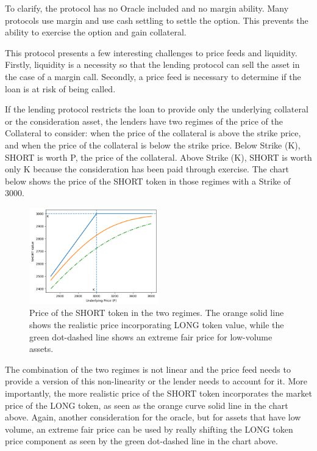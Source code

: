 \documentclass[%
 reprint,
 amsmath,amssymb,
 aps,
]{revtex4-2}
\begin{document}
To clarify, the protocol has no Oracle included and no margin ability. 
Many protocols use margin and use cash settling to settle the option.
This prevents the ability to exercise the option and gain collateral.

This protocol presents a few interesting challenges to price feeds and liquidity. 
Firstly, liquidity is a necessity so that the lending protocol can sell the asset in the case of a margin call.
Secondly, a price feed is necessary to determine if the loan is at risk of being called.

If the lending protocol restricts the loan to provide only the underlying collateral or the consideration asset,
the lenders have two regimes of the price of the Collateral to consider: 
when the price of the collateral is above the strike price, and when the price of the collateral is below the strike price.
Below Strike (K), SHORT is worth P, the price of the collateral. 
Above Strike (K), SHORT is worth only K because the consideration has been paid through exercise.
The chart below shows the price of the SHORT token in those regimes with a Strike of 3000.
\begin{figure}[h]
  \centering
  \includegraphics[width=0.5\textwidth]{short_price.png}
  \caption{Price of the SHORT token in the two regimes. The orange solid line shows the realistic price incorporating LONG token value, while the green dot-dashed line shows an extreme fair price for low-volume assets.}
  \label{fig:short_price}
\end{figure}

The combination of the two regimes is not linear and the price feed needs to provide a version of this non-linearity or the lender needs to account for it.
More importantly, the more realistic price of the SHORT token incorporates the market price of the LONG token, as seen as the orange curve solid line in the chart above.
Again, another consideration for the oracle, but for assets that have low volume, an extreme fair price can be used by really shifting the LONG token price component as seen by the green dot-dashed line in the chart above.
\end{document}
